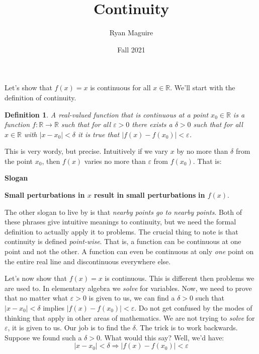 \documentclass{article}
\title{Continuity}
\author{Ryan Maguire}
\date{Fall 2021}
\theoremstyle{normal}
\newtheorem{definition}{Definition}
\begin{document}
    \maketitle
    Let's show that $f(x)=x$ is continuous for all $x\in\mathbb{R}$. We'll
    start with the definition of continuity.
    \begin{definition}
        A real-valued function that is continuous at a point
        $x_{0}\in\mathbb{R}$ is a function $f:\mathbb{R}\rightarrow\mathbb{R}$
        such that for all $\varepsilon>0$ there exists a $\delta>0$ such that
        for all $x\in\mathbb{R}$ with $|x-x_{0}|<\delta$ it is true that
        $|f(x)-f(x_{0})|<\varepsilon$.
    \end{definition}
    This is very wordy, but precise. Intuitively if we vary $x$ by no more than
    $\delta$ from the point $x_{0}$, then $f(x)$ varies no more than
    $\varepsilon$ from $f(x_{0})$. That is:
    \begin{center}
        \textbf{Slogan}
        \par
        \textbf{Small perturbations in $x$ result in small perturbations}
        \textbf{in $f(x)$}. 
    \end{center}
    The other slogan to live by is that
    \textit{nearby points go to nearby points}. Both of these phrases give
    intuitive meanings to continuity, but we need the formal definition to
    actually apply it to problems. The crucial thing to note is that
    continuity is defined \textit{point-wise}. That is, a function can be
    continuous at one point and not the other. A function can even be
    continuous at only \textit{one} point on the entire real line
    and discontinuous everywhere else.
    \par\hfill\par
    Let's now show that $f(x)=x$ is continuous. This is different then problems
    we are used to. In elementary algebra we \textit{solve} for variables. Now,
    we need to prove that no matter what $\varepsilon>0$ is given to us, we can
    find a $\delta>0$ such that $|x-x_{0}|<\delta$ implies
    $|f(x)-f(x_{0})|<\varepsilon$. Do not get confused by the modes of thinking
    that apply in other areas of mathematics. We are not trying to
    \textit{solve} for $\varepsilon$, it is given to us. Our job is to find
    the $\delta$. The trick is to work backwards. Suppose we
    found such a $\delta>0$. What would this say? Well, we'd have:
    \begin{equation}
        |x-x_{0}|<\delta\Rightarrow|f(x)-f(x_{0})|<\varepsilon
    \end{equation}
\end{document}
